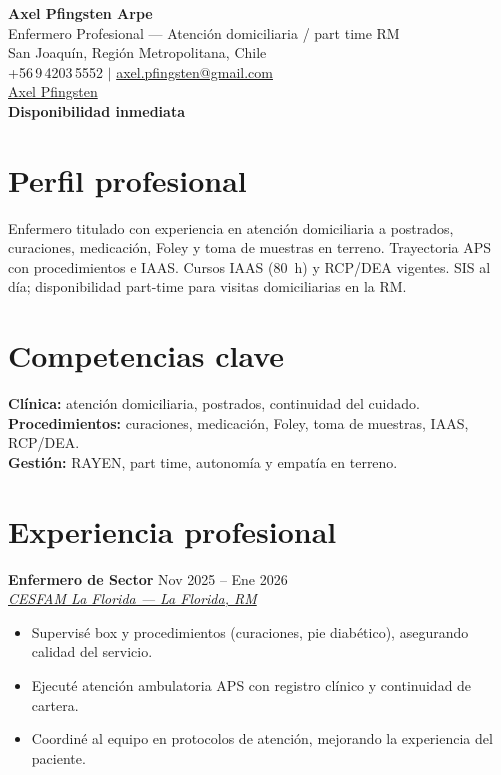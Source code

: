 \documentclass[11pt,a4paper]{article}
\newcommand{\cventry}[3]{%
  \textbf{#1} \hfill #2\\
  \textit{#3}\\[2pt]
}
\newcommand{\maps}[2]{%
  \href{https://www.google.com/maps/search/?api=1\&query=#1}{#2}%
}
\begin{document}

\begin{center}
  {\LARGE\bfseries Axel Pfingsten Arpe}\\[4pt]
  {\large Enfermero Profesional --- Atención domiciliaria / part time RM}\\[6pt]
  San Joaquín, Región Metropolitana, Chile\\[2pt]
  +56\,9\,4203\,5552 \quad$\vert$\quad
  \href{mailto:axel.pfingsten@gmail.com}{axel.pfingsten@gmail.com}\\[2pt]
  \href{https://www.linkedin.com/in/axel-pfingsten-arpe-43781a209/}{Axel Pfingsten}\\[2pt]
  \textbf{Disponibilidad inmediata}
\end{center}

\vspace{2pt}

\section{Perfil profesional}
Enfermero titulado con experiencia en atención domiciliaria a postrados, curaciones, medicación, Foley y toma de muestras en terreno. Trayectoria APS con procedimientos e IAAS. Cursos IAAS (80~h) y RCP/DEA vigentes. SIS al día; disponibilidad part-time para visitas domiciliarias en la RM.

\section{Competencias clave}
\textbf{Clínica:} atención domiciliaria, postrados, continuidad del cuidado.\\[2pt]
\textbf{Procedimientos:} curaciones, medicación, Foley, toma de muestras, IAAS, RCP/DEA.\\[2pt]
\textbf{Gestión:} RAYEN, part time, autonomía y empatía en terreno.\\[2pt]


\section{Experiencia profesional}

\cventry{Enfermero de Sector}
{Nov 2025 -- Ene 2026}
{\maps{CESFAM+La+Florida+Av.+La+Florida+6015,+La+Florida,+Santiago}{CESFAM La Florida — La Florida, RM}}
\begin{itemize}
  \item Supervisé box y procedimientos (curaciones, pie diabético), asegurando calidad del servicio.
  \item Ejecuté atención ambulatoria APS con registro clínico y continuidad de cartera.
  \item Coordiné al equipo en protocolos de atención, mejorando la experiencia del paciente.
\end{itemize}
\vspace{6pt}
\end{document}
